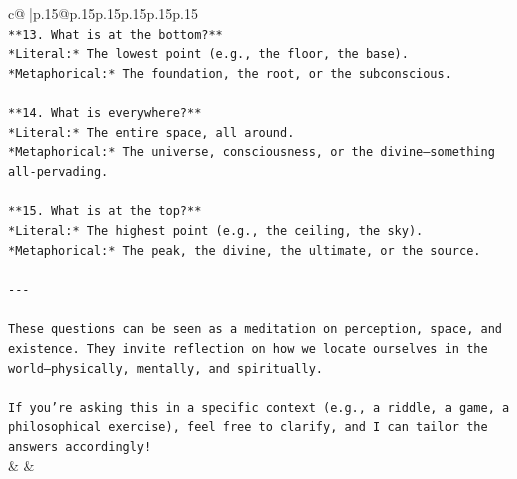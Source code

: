 \documentclass{article}
\begin{document}
{\begin{supertabular}{c@{$\;$}|p{.15\linewidth}@{}p{.15\linewidth}p{.15\linewidth}p{.15\linewidth}p{.15\linewidth}p{.15\linewidth}}
{{{\\ 
\texttt{**13. What is at the bottom?**  } \\
\texttt{*Literal:* The lowest point (e.g., the floor, the base).  } \\
\texttt{*Metaphorical:* The foundation, the root, or the subconscious.} \\
\\ 
\texttt{**14. What is everywhere?**  } \\
\texttt{*Literal:* The entire space, all around.  } \\
\texttt{*Metaphorical:* The universe, consciousness, or the divine—something all{-}pervading.} \\
\\ 
\texttt{**15. What is at the top?**  } \\
\texttt{*Literal:* The highest point (e.g., the ceiling, the sky).  } \\
\texttt{*Metaphorical:* The peak, the divine, the ultimate, or the source.} \\
\\ 
\texttt{{-}{-}{-}} \\
\\ 
\texttt{These questions can be seen as a meditation on perception, space, and existence. They invite reflection on how we locate ourselves in the world—physically, mentally, and spiritually.} \\
\\ 
\texttt{If you're asking this in a specific context (e.g., a riddle, a game, a philosophical exercise), feel free to clarify, and I can tailor the answers accordingly!} \\
            }
        }
    }
    & & \\ \\


\end{supertabular}}
\end{document}
